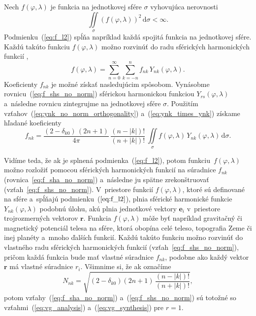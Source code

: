 \documentclass[a4paper, 12pt]{book}
\newcommand{\diff}{\mathrm d}
\let\vec\mathbf
\begin{document}
Nech $f(\varphi, \lambda)$ je funkcia na jednotkovej sfére $\sigma$ vyhovujúca 
nerovnosti
%
\begin{equation}
\label{eq:f_l2}
\iint\limits_\sigma \left( f(\varphi, \lambda) \right)^2 \, \diff \sigma 
< \infty{.}
\end{equation}
%
Podmienku~(\ref{eq:f_l2}) spĺňa napríklad každá spojitá funkcia na jednotkovej
sfére.  Každú takúto funkciu $f(\varphi, \lambda)$ možno rozvinúť do radu
sférických harmonických funkcií \parencite[napríklad][]{MoritzPhysicalGeodesy},
%
\begin{equation}
\label{eq:f_shs_no_norm}
f(\varphi, \lambda) = \sum_{n = 0}^\infty \sum_{k = -n}^n f_{nk} \,
Y_{nk}(\varphi, \lambda){.}
\end{equation}
%
Koeficienty $f_{nk}$ je možné získať nasledujúcim spôsobom.  Vynásobme 
rovnicu~(\ref{eq:f_shs_no_norm}) sférickou harmonickou funkciou 
$Y_{rs}(\varphi, \lambda)$ a~následne rovnicu zintegrujme na jednotkovej sfére 
$\sigma$.  Použitím vzťahov~(\ref{eq:ynk_no_norm_orthogonality}) 
a~(\ref{eq:ynk_times_ynk}) získame hľadané koeficienty
%
\begin{equation}
\label{eq:f_sha_no_norm}
f_{nk} = \frac{(2 - \delta_{k0}) \, (2n + 1)}{4\pi} \, \frac{(n - |k|)!}{(n 
+ |k|)!} \, \iint\limits_{\sigma} f(\varphi, \lambda) \, Y_{nk}(\varphi, 
\lambda) \, \diff \sigma{.}
\end{equation}

Vidíme teda, že ak je splnená podmienka~(\ref{eq:f_l2}), potom 
funkciu~$f(\varphi, \lambda)$ možno rozložiť pomocou sférických harmonických 
funkcií na súradnice $f_{nk}$ (rovnica~\ref{eq:f_sha_no_norm}) a~následne ju 
spätne zrekonštruovať (vzťah~\ref{eq:f_shs_no_norm}).  V~priestore funkcií 
$f(\varphi, \lambda)$, ktoré sú definované na sfére a~spĺňajú 
podmienku~($\ref{eq:f_l2}$), plnia sférické harmonické funkcie $Y_{nk}(\varphi, 
\lambda)$ podobnú úlohu, akú plnia jednotkové vektory $\vec e_i$ v~priestore 
trojrozmerných vektorov $\vec r$.  Funkcia $f(\varphi,\lambda)$ môže byť 
napríklad gravitačný či magnetický potenciál telesa na sfére, ktorá obopína 
celé teleso, topografia Zeme či inej planéty a~mnoho ďalších funkcií.  Každú 
takúto funkciu možno rozvinúť do vlastného radu sférických harmonických funkcií 
(vzťah~\ref{eq:f_shs_no_norm}), pričom každá funkcia bude mať vlastné súradnice 
$f_{nk}$, podobne ako každý vektor $\vec r$ má vlastné súradnice $r_i$.  
Všimnime si, že ak označíme
%
\begin{equation}
\label{eq:sh_norm}
N_{nk} = \sqrt{(2 - \delta_{k0}) (2n + 1) \, \frac{(n - |k|)!}{(n
+ |k|)!}}{,}
\end{equation}
%
potom vzťahy~(\ref{eq:f_sha_no_norm}) a~(\ref{eq:f_shs_no_norm}) sú totožné so
vzťahmi~(\ref{eq:vg_analysis}) a~(\ref{eq:vg_synthesis}) pre $r = 1$.
\end{document}
